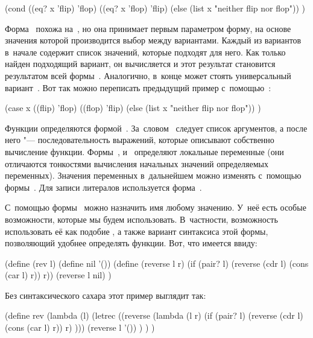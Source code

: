 \begin{code:lisp}
(cond ((eq? x 'flip) 'flop)
      ((eq? x 'flop) 'flip)
      (else (list x "neither flip nor flop")) )
\end{code:lisp}

Форма~ похожа на~, но она принимает первым параметром форму,
на основе значения которой производится выбор между вариантами. Каждый из
вариантов в~начале содержит список значений, которые подходят для него. Как
только найден подходящий вариант, он вычисляется и этот результат становится
результатом всей формы~. Аналогично, в~конце может стоять универсальный
вариант~. Вот так можно переписать предыдущий пример
с~помощью~:

\begin{code:lisp}
(case x
  ((flip) 'flop)
  ((flop) 'flip)
  (else (list x "neither flip nor flop")) )
\end{code:lisp}

Функции определяются формой~. За~словом~ следует список
аргументов, а после него "--- последовательность выражений, которые описывают
собственно вычисление функции. Формы~,  и~
определяют локальные переменные (они отличаются тонкостями вычисления начальных
значений определяемых переменных). Значения переменных в~дальнейшем можно
изменять с~помощью формы~. Для записи литералов используется
форма~.

С~помощью формы~ можно назначить имя любому значению. У~неё есть
особые возможности, которые мы будем использовать. В~частности, возможность
использовать её как подобие , а также вариант синтаксиса этой формы,
позволяющий удобнее определять функции. Вот, что имеется ввиду:

\begin{code:lisp}
(define (rev l)
  (define nil '())
  (define (reverse l r)
    (if (pair? l) (reverse (cdr l) (cons (car l) r)) r))
  (reverse l nil) )
\end{code:lisp}

\noindent Без синтаксического сахара этот пример выглядит так:

\begin{code:lisp}
(define rev
  (lambda (l)
    (letrec ((reverse (lambda (l r)
                        (if (pair? l) (reverse (cdr l)
                                               (cons (car l) r))
                            r) )))
      (reverse l '()) ) ) )
\end{code:lisp}

